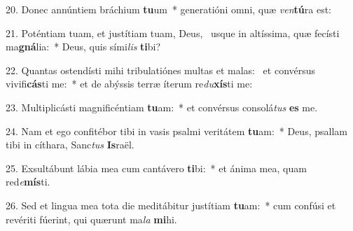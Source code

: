 20. Donec annúntiem bráchium \textbf{tu}um~*  generatióni omni, quæ \textit{ven}\textbf{tú}ra est:\

21. Poténtiam tuam, et justítiam tuam, Deus, \dag\  usque in altíssima, quæ fecísti ma\textbf{gná}lia:~*  Deus, quis sími\textit{lis} \textbf{ti}bi?\

22. Quantas ostendísti mihi tribulatiónes multas et malas: \dag\  et convérsus vivifi\textbf{cás}ti me:~*  et de abýssis terræ íterum re\textit{du}\textbf{xís}ti me:\

23. Multiplicásti magnificéntiam \textbf{tu}am:~*  et convérsus consolá\textit{tus} \textbf{es} me.\

24. Nam et ego confitébor tibi in vasis psalmi veritátem \textbf{tu}am:~*  Deus, psallam tibi in cíthara, Sanc\textit{tus} \textbf{Is}raël.\

25. Exsultábunt lábia mea cum cantávero \textbf{ti}bi:~*  et ánima mea, quam red\textit{e}\textbf{mís}ti.\

26. Sed et lingua mea tota die meditábitur justítiam \textbf{tu}am:~*  cum confúsi et revériti fúerint, qui quærunt ma\textit{la} \textbf{mi}hi.\

